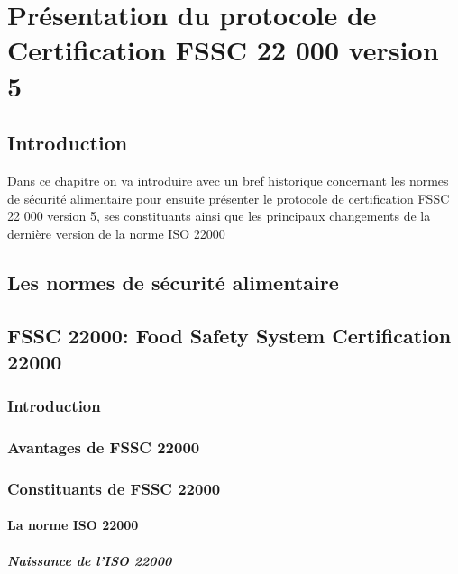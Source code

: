 
\setcounter{chapter}{1}
\chapter{ Présentation du protocole de Certification FSSC 22 000 version 5}
\minitoc %
\graphicspath{{Chapter2/figures/}}


\pagestyle{fancy}
\fancyhf{}
\fancyhead[R]{\bfseries\rightmark}
\fancyfoot[R]{\thepage}
\renewcommand{\headrulewidth}{0.5pt}
\renewcommand{\footrulewidth}{0pt}
\renewcommand{\chaptermark}[1]{\markboth{\MakeUppercase{\chaptername~\thechapter. #1 }}{}}
\renewcommand{\sectionmark}[1]{\markright{\thechapter.\thesection~ #1}}

\begin{spacing}{1.2}
\section*{Introduction}
Dans ce chapitre on va introduire avec un bref historique concernant les  normes de sécurité alimentaire pour ensuite présenter le protocole de certification FSSC 22 000 version 5, ses constituants ainsi que les principaux changements de la dernière version de la norme ISO 22000

\section{Les normes de sécurité alimentaire}
\section{FSSC 22000: Food Safety System Certification 22000}
\subsection*{Introduction}
\subsection{Avantages de FSSC 22000}
\subsection{Constituants de FSSC 22000}
\subsubsection{La norme ISO 22000}
\paragraph{Naissance de l’ISO 22000}


\end{spacing}
